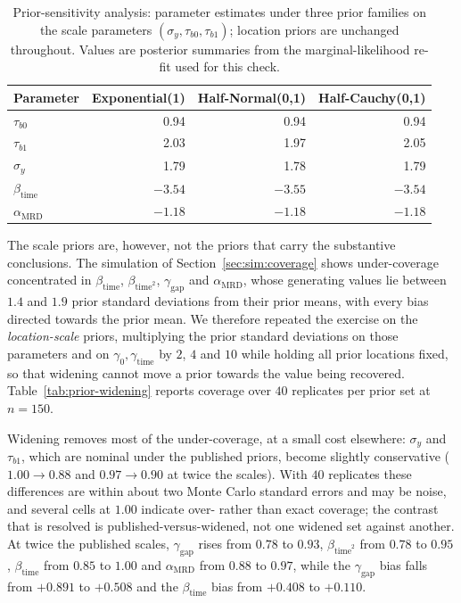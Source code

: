 \documentclass[11pt]{article}
\begin{document}
\begin{table}[!htbp]
\centering
\caption{Prior-sensitivity analysis: parameter estimates under three prior
families on the scale parameters $(\sigma_y,\tau_{b0},\tau_{b1})$; location
priors are unchanged throughout. Values are posterior summaries from the
marginal-likelihood re-fit used for this check.}
\label{tab:prior-sensitivity}
\small
\begin{tabular}{lrrr}
\toprule
Parameter & Exponential(1) & Half-Normal(0,1) & Half-Cauchy(0,1)\\
\midrule
$\tau_{b0}$              & 0.94 & 0.94 & 0.94\\
$\tau_{b1}$              & 2.03 & 1.97 & 2.05\\
$\sigma_y$               & 1.79 & 1.78 & 1.79\\
$\beta_{\mathrm{time}}$  & $-3.54$ & $-3.55$ & $-3.54$\\
$\alpha_{\mathrm{MRD}}$  & $-1.18$ & $-1.18$ & $-1.18$\\
\bottomrule
\end{tabular}
\end{table}

The scale priors are, however, not the priors that carry the substantive
conclusions. The simulation of Section~\ref{sec:sim:coverage} shows
under-coverage concentrated in $\beta_{\mathrm{time}}$,
$\beta_{\mathrm{time}^2}$, $\gamma_{\mathrm{gap}}$ and $\alpha_{\mathrm{MRD}}$,
whose generating values lie between $1.4$ and $1.9$ prior standard deviations
from their prior means, with every bias directed towards the prior mean. We
therefore repeated the exercise on the \emph{location-scale} priors, multiplying
the prior standard deviations on those parameters and on
$\gamma_0,\gamma_{\mathrm{time}}$ by $2$, $4$ and $10$ while holding all prior
locations fixed, so that widening cannot move a prior towards the value being
recovered. Table~\ref{tab:prior-widening} reports coverage over $40$ replicates
per prior set at $n=150$.

Widening removes most of the under-coverage, at a small cost elsewhere:
$\sigma_y$ and $\tau_{b1}$, which are nominal under the published priors, become
slightly conservative ($1.00\to0.88$ and $0.97\to0.90$ at twice the scales).
With $40$ replicates these differences are within about two Monte Carlo standard
errors and may be noise, and several cells at $1.00$ indicate over- rather than
exact coverage; the contrast that is resolved is published-versus-widened, not
one widened set against another. At twice the published scales,
$\gamma_{\mathrm{gap}}$ rises from $0.78$ to $0.93$, $\beta_{\mathrm{time}^2}$
from $0.78$ to $0.95$, $\beta_{\mathrm{time}}$ from $0.85$ to $1.00$ and
$\alpha_{\mathrm{MRD}}$ from $0.88$ to $0.97$, while the $\gamma_{\mathrm{gap}}$
bias falls from $+0.891$ to $+0.508$ and the $\beta_{\mathrm{time}}$ bias from
$+0.408$ to $+0.110$.
\end{document}
